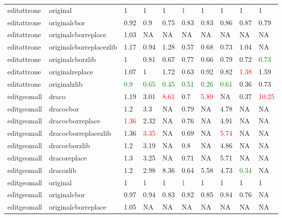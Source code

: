 \begin{landscape}
\begin{longtable}{llllllllll}
editattrone & original & 1 & 1 & 1 & \textcolor{red}{1} & 1 & 1 & 1 & 1\\
editattrone & originalcbor & 0.92 & 0.9 & 0.75 & 0.83 & 0.83 & 0.86 & 0.87 & 0.79\\
editattrone & originalcborreplace & 1.03 & NA & NA & NA & NA & NA & NA & NA\\
\rowcolor{lightgray}  editattrone & originalcborreplacezlib & 1.17 & 0.94 & 1.28 & 0.57 & 0.68 & 0.73 & 1.04 & NA\\
\rowcolor{lightgray}  editattrone & originalcborzlib & 1 & 0.81 & 0.67 & 0.77 & 0.66 & 0.79 & 0.72 & \textcolor{green}{0.73}\\
\rowcolor{lightgray}  editattrone & originalreplace & 1.07 & 1 & 1.72 & 0.63 & 0.92 & 0.82 & \textcolor{red}{1.38} & 1.59\\
\rowcolor{lightgray}  editattrone & originalzlib & \textcolor{green}{0.9} & \textcolor{green}{0.65} & \textcolor{green}{0.45} & \textcolor{green}{0.51} & \textcolor{green}{0.26} & \textcolor{green}{0.61} & 0.36 & 0.73\\
\rowcolor{lightgray}  editgeomall & draco & 1.19 & 3.01 & \textcolor{red}{8.61} & 0.7 & \textcolor{red}{5.89} & NA & 0.37 & \textcolor{red}{10.25}\\
\rowcolor{lightgray}  editgeomall & dracocbor & 1.2 & 3.3 & NA & 0.79 & NA & 4.78 & NA & NA\\
\rowcolor{lightgray}  editgeomall & dracocborreplace & \textcolor{red}{1.36} & 2.32 & NA & 0.76 & NA & 4.91 & NA & NA\\
\rowcolor{lightgray}  editgeomall & dracocborreplacezlib & 1.36 & \textcolor{red}{3.35} & NA & 0.69 & NA & \textcolor{red}{5.74} & NA & NA\\
\rowcolor{lightgray}  editgeomall & dracocborzlib & 1.2 & 3.19 & NA & 0.8 & NA & 4.86 & NA & NA\\
\rowcolor{lightgray}  editgeomall & dracoreplace & 1.3 & 3.25 & NA & 0.71 & NA & 5.71 & NA & NA\\
\rowcolor{lightgray}  editgeomall & dracozlib & 1.2 & 2.98 & 8.36 & 0.64 & 5.58 & 4.73 & \textcolor{green}{0.34} & NA\\
\rowcolor{lightgray}  editgeomall & original & 1 & 1 & 1 & \textcolor{red}{1} & 1 & 1 & 1 & 1\\
\rowcolor{lightgray}  editgeomall & originalcbor & 0.97 & 0.94 & 0.83 & 0.82 & 0.85 & 0.84 & 0.76 & NA\\
editgeomall & originalcborreplace & 1.05 & NA & NA & NA & NA & NA & NA & NA\\

\end{longtable}
\end{landscape}
